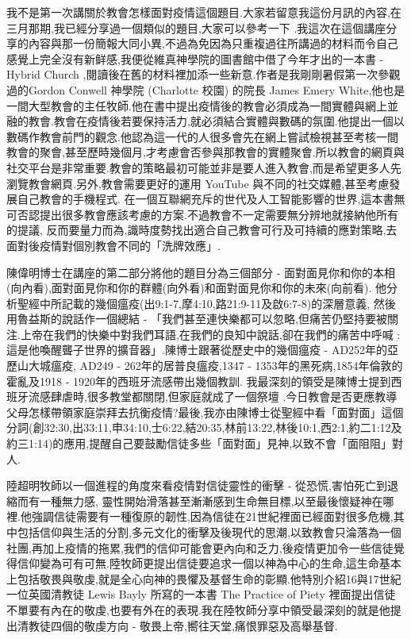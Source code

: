 \documentclass{book}
\begin{document}
我不是第一次講關於教會怎樣面對疫情這個題目.大家若留意我這份月訊的內容,在三月那期,我已經分享過一個類似的題目,大家可以參考一下 .我這次在這個講座分享的內容與那一份簡報大同小異,不過為免因為只重複過往所講過的材料而令自己感覺上完全沒有新鲜感,我便從維真神學院的圖書館中借了今年才出的一本書 -  Hybrid Church ,閱讀後在舊的材料裡加添一些新意.作者是我剛剛暑假第一次參觀過的Gordon Conwell 神學院 (Charlotte 校園) 的院長 James Emery White,他也是一間大型教會的主任牧師.他在書中提出疫情後的教會必須成為一間實體與網上並融的教會.教會在疫情後若要保持活力,就必須結合實體與數碼的氛圍.他提出一個以數碼作教會前門的觀念.他認為這一代的人很多會先在網上嘗試檢視甚至考核一間教會的聚會,甚至歷時幾個月,才考慮會否參與那教會的實體聚會.所以教會的網頁與社交平台是非常重要.教會的策略最初可能並非是要人進入教會,而是希望更多人先瀏覽教會網頁.另外,教會需要更好的運用 YouTube 與不同的社交媒體,甚至考慮發展自己教會的手機程式. 在一個互聯網充斥的世代及人工智能影響的世界,這本書無可否認提出很多教會應該考慮的方案.不過教會不一定需要無分辨地就接納他所有的提議, 反而要量力而為,識時度勢找出適合自己教會可行及可持續的應對策略,去面對後疫情對個別教會不同的「洗牌效應」.

陳偉明博士在講座的第二部分將他的題目分為三個部分 - 面對面見你和你的本相(向內看),面對面見你和你的群體(向外看)和面對面見你和你的未來(向前看). 他分析聖經中所記載的幾個瘟疫(出9:1-7,摩4:10,路21:9-11及啟6:7-8)的深層意義, 然後用魯益斯的說話作一個總結 - 「我們甚至連快樂都可以忽略,但痛苦仍堅持要被關注.上帝在我們的快樂中對我們耳語,在我們的良知中說話,卻在我們的痛苦中呼喊 : 這是他喚醒聾子世界的擴音器」.陳博士跟著從歷史中的幾個瘟疫 - AD252年的亞歷山大城瘟疫, AD249 - 262年的居普良瘟疫,1347 - 1353年的黑死病,1854年倫敦的霍亂及1918 - 1920年的西班牙流感帶出幾個教訓. 我最深刻的領受是陳博士提到西班牙流感肆虐時,很多教堂都關閉,但家庭就成了一個祭壇 .今日教會是否更應教導父母怎樣帶領家庭崇拜去抗衡疫情?最後,我亦由陳博士從聖經中看「面對面」這個分詞(創32:30,出33:11,申34:10,士6:22,結20:35,林前13:22,林後10:1,西2:1,約二1:12及約三1:14)的應用,提醒自己要鼓勵信徒多些「面對面」見神,以致不會「面阻阻」對人.

陸超明牧師以一個進程的角度來看疫情對信徒靈性的衝擊 - 從恐慌,害怕死亡到退縮而有一種無力感, 靈性開始滑落甚至漸漸感到生命無目標,以至最後懷疑神在哪裡.他強調信徒需要有一種復原的韌性,因為信徒在21世紀裡面已經面對很多危機,其中包括信仰與生活的分割,多元文化的衝擊及後現代的思潮,以致教會只淪落為一個社團,再加上疫情的拖累,我們的信仰可能會更內向和乏力,後疫情更加令一些信徒覺得信仰變為可有可無.陸牧師更提出信徒要追求一個以神為中心的生命,這生命基本上包括敬畏與敬虔,就是全心向神的畏懼及基督生命的彰顯.他特別介紹16與17世紀一位英國清教徒 Lewis Bayly 所寫的一本書 The Practice of Piety 裡面提出信徒不單要有內在的敬虔,也要有外在的表現.我在陸牧師分享中領受最深刻的就是他提出清教徒四個的敬虔方向  -  敬畏上帝,嚮往天堂,痛恨罪惡及高舉基督.
\end{document}
